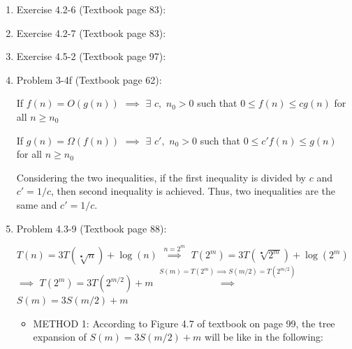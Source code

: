 \documentclass[11pt]{article}
\begin{document}
\begin{enumerate}

\itemsep 0.35in

\item Exercise 4.2-6 (Textbook page 83): 

	


\item Exercise 4.2-7 (Textbook page 83): 


\item Exercise 4.5-2 (Textbook page 97): 



































\item Problem 3-4f (Textbook page 62):

	If $ f(n)= O(g(n)) $ $\implies$ $ \exists $ $ c, $ $ n_0>0 $ such that $ 0 \leq f(n) \leq cg(n) $ for all $ n \geq n_0 $  
	
	If $ g(n)= \Omega(f(n)) $ $\implies$ $ \exists $ $ c{'}, $ $ n_0>0 $ such that $ 0 \leq c{'}f(n) \leq g(n) $ for all $ n \geq n_0 $     
	
	Considering the two inequalities, if the first inequality is divided by $c$ and $c{'} = 1/c$, then second inequality is achieved. Thus, two inequalities are the same and $c{'} = 1/c$.  





\pagebreak

\item Problem 4.3-9 (Textbook page 88):
	
	$ T(n) = 3T(\sqrt[•]{n}) + \log(n) $ 
	$ \overset{n=2^m}{\implies} $ 
	$ T(2^m) = 3T(\sqrt[•]{2^m}) + \log(2^m) $ 
	$ \implies $ 
	$T(2^m) = 3T(2^{m/2}) + m $ 
	$ \overset{S(m)=T(2^m) \implies S(m/2)=T(2^{m/2})}{\implies} $ 
	$ S(m) = 3S(m/2) + m$ 
	
	
	\begin{itemize}
    	\item METHOD 1:
     	According to Figure 4.7 of textbook on page 99, the tree expansion of $ S(m) = 3S(m/2) + m$ will be like in the following:
     	

\end{itemize}
\end{enumerate}
\end{document}
